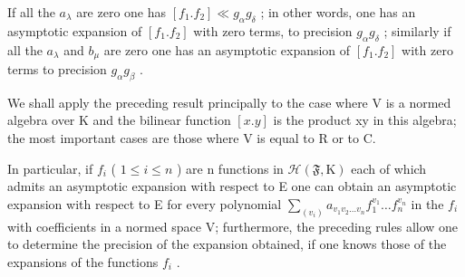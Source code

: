 If all the \(a_{\lambda}\) are zero one has \([f_{1}.f_{2}] \ll g_{\alpha}g_{\delta}\) ; in other words, one has an asymptotic expansion of \([f_{1}.f_{2}]\) with zero terms, to precision \(g_{\alpha}g_{\delta}\) ; similarly if all the \(a_{\lambda}\) and \(b_{\mu}\) are zero one has an asymptotic expansion of \([f_{1}.f_{2}]\) with zero terms to precision \(g_{\alpha}g_{\beta}\) .

We shall apply the preceding result principally to the case where V is a normed algebra over K and the bilinear function \([x.y]\) is the product xy in this algebra; the most important cases are those where V is equal to R or to C.

In particular, if \(f_{i}\) ( \(1 \leqslant i \leqslant n\) ) are n functions in \(\mathcal{H}(\mathfrak{F}, \mathrm{K})\) each of which admits an asymptotic expansion with respect to E one can obtain an asymptotic expansion with respect to E for every polynomial \(\sum_{(v_{i})} a_{v_{1}v_{2}\ldots v_{n}} f_{1}^{v_{1}} \ldots f_{n}^{v_{n}}\) in the \(f_{i}\) with coefficients in a normed space V; furthermore, the preceding rules allow one to determine the precision of the expansion obtained, if one knows those of the expansions of the functions \(f_{i}\) .

